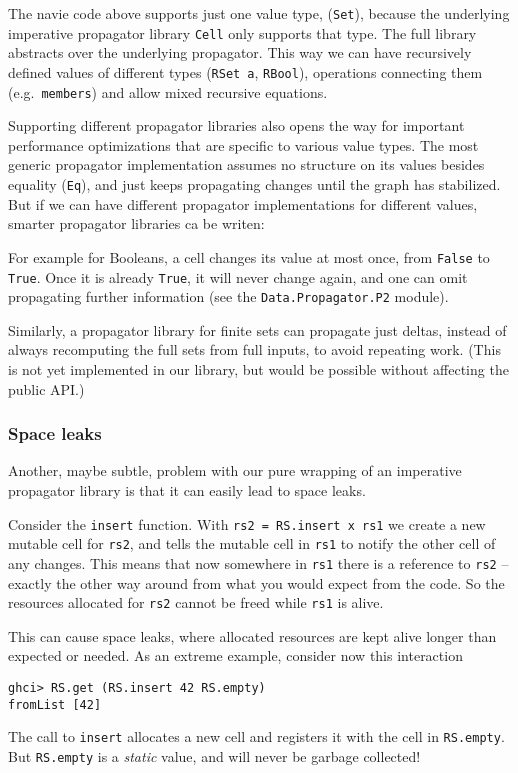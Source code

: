 \documentclass[manuscript,screen,acmsmall]{acmart}
\begin{document}
The navie code above supports just one value type, (\verb|Set|), because the underlying imperative propagator library \verb|Cell| only supports that type. The full library abstracts over the underlying propagator. This way we can have recursively defined values of different types (\verb|RSet a|, \verb|RBool|), operations connecting them (e.g.\ \verb|members|) and allow mixed recursive equations.

Supporting different propagator libraries also opens the way for important performance optimizations that are specific to various value types. The most generic propagator implementation assumes no structure on its values besides equality (\verb|Eq|), and just keeps propagating changes until the graph has stabilized. But if we can have different propagator implementations for different values, smarter propagator libraries ca be writen:

For example for Booleans, a cell changes its value at most once, from \verb|False| to \verb|True|. Once it is already \verb|True|, it will never change again, and one can omit propagating further information (see the \verb|Data.Propagator.P2| module).

Similarly, a propagator library for finite sets can propagate just deltas, instead of always recomputing the full sets from full inputs, to avoid repeating work. (This is not yet implemented in our library, but would be possible without affecting the public API.)

\subsubsection{Space leaks}\label{sec:spaceleak}

Another, maybe subtle, problem with our pure wrapping of an imperative propagator library is that it can easily lead to space leaks.

Consider the \verb|insert| function. With \verb|rs2 = RS.insert x rs1| we create a new mutable cell for \verb|rs2|, and tells the mutable cell in \verb|rs1| to notify the other cell of any changes. This means that now somewhere in \verb|rs1| there is a reference to \verb|rs2| -- exactly the other way around from what you would expect from the code. So the resources allocated for \verb|rs2| cannot be freed while \verb|rs1| is alive.

This can cause space leaks, where allocated resources are kept alive longer than expected or needed. As an extreme example, consider now this interaction
\begin{verbatim}
ghci> RS.get (RS.insert 42 RS.empty)
fromList [42]
\end{verbatim}
The call to \verb|insert| allocates a new cell and registers it with the cell in \verb|RS.empty|. But \verb|RS.empty| is a \emph{static} value, and will never be garbage collected!
\end{document}
